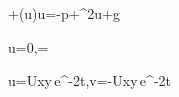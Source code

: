 +(\mathbf u\cdot\nabla)\mathbf u=-\rho\nabla p+\nu\nabla^2\mathbf u+\mathbf g

\nabla\cdot\mathbf u=0,\qquad \nu=\frac\mu\rho

u=U\sin x\cos y\,e^{-2\nu t},\qquad v=-U\cos x\sin y\,e^{-2\nu t}
